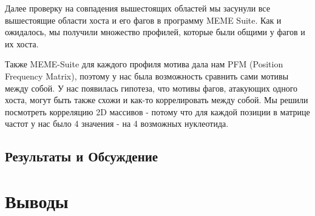 \documentclass[a4paper,12pt]{article}
\begin{document}
\par{Далее проверку на совпадения вышестоящих областей мы засунули все вышестоящие области хоста и его фагов в программу
MEME Suite. Как и ожидалось, мы получили множество профилей, которые были общими у фагов и их хоста. }

\par{Также MEME-Suite для каждого профиля мотива дала нам PFM (Position Frequency Matrix), поэтому у нас была возможность
сравнить сами мотивы между собой. У нас появилась гипотеза, что мотивы фагов, атакующих одного хоста, могут быть также
схожи и как-то коррелировать между собой. Мы решили посмотреть корреляцию 2D массивов - потому что для каждой позиции в
матрице частот у нас было 4 значения - на 4 возможных нуклеотида.}

\newpage
\begin{center}
\section{Результаты и Обсуждение}
\end{center}

\newpage
\section{Выводы}
\end{document}
